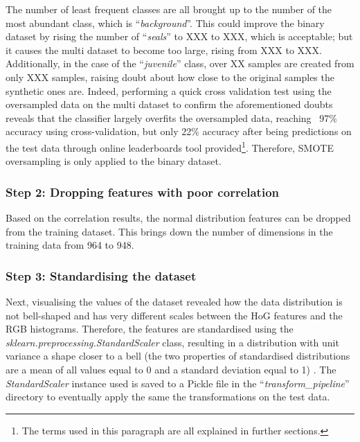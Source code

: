 \documentclass[letterpaper,12pt]{article}
\begin{document}
The number of least frequent classes are all brought up to the number of the most abundant class, which is ``\textit{background}''. This could improve the binary dataset by rising the number of ``\textit{seals}'' to XXX  to XXX, which is acceptable; but it causes the multi dataset to become too large, rising from XXX to XXX. Additionally, in the case of the ``\textit{juvenile}'' class, over XX samples are created from only XXX samples, raising doubt about how close to the original samples the synthetic ones are. Indeed, performing a quick cross validation test using the oversampled data on the multi dataset to confirm the aforementioned doubts reveals that the classifier largely overfits the oversampled data, reaching ~97\% accuracy using cross-validation, but only 22\% accuracy after being predictions on the test data through online leaderboards tool provided\footnote{The terms used in this paragraph are all explained in further sections.}. Therefore, SMOTE oversampling is only applied to the binary dataset.

\subsubsection{Step 2: Dropping features with poor correlation}
\label{sec:drop-poor-features}

Based on the correlation results, the normal distribution features can be dropped from the training dataset. This brings down the number of dimensions in the training data from 964 to 948.\\

\subsubsection{Step 3: Standardising the dataset}
\label{sec:standard-scaling}

Next, visualising the values of the dataset revealed how the data distribution is not bell-shaped and has very different scales between the HoG features and the RGB histograms. Therefore, the features are standardised using the \textit{sklearn.preprocessing.StandardScaler} class, resulting in a distribution with unit variance a shape closer to a bell (the two properties of standardised distributions are a mean of all values equal to 0 and a standard deviation equal to 1) \cite{Geron2019}\cite{Glen2014}. The \textit{StandardScaler} instance used is saved to a Pickle file in the ``\textit{transform\_pipeline}'' directory to eventually apply the same the transformations on the test data.
\end{document}

